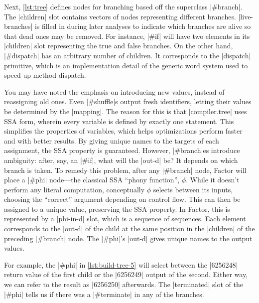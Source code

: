 Next, \vref{lst:tree} defines nodes for branching based off the superclass
\factor|#branch|.  The \factor|children| slot contains vectors of nodes
representing different branches.  \factor|live-branches| is filled in during
later analyses to indicate which branches are alive so that dead ones may be
removed.  For instance, \factor|#if| will have two elements in its
\factor|children| slot representing the true and false branches.  On the other
hand, \factor|#dispatch| has an arbitrary number of children.  It corresponds
to the \factor|dispatch| primitive, which is an implementation detail of the
generic word system used to speed up method dispatch.

You may have noted the emphasis on introducing new values, instead of
reassigning old ones.  Even \factor|#shuffle|s output fresh identifiers,
letting their values be determined by the \factor|mapping|.  The reason for
this is that \factor|compiler.tree| uses \gls{SSA} form, wherein every variable
is defined by exactly one statement.  This simplifies the properties of
variables, which helps optimizations perform faster and with better
results.  By giving unique names to the targets of each assignment,
the \gls{SSA} property is guaranteed.  However, \factor|#branch|es introduce
ambiguity: after, say, an \factor|#if|, what will the \factor|out-d| be?  It
depends on which branch is taken.  To remedy this problem, after any
\factor|#branch| node, Factor will place a \factor|#phi| node---the classical
\gls{SSA} ``phony function'', $\phi$.  While it doesn't perform any literal
computation, conceptually $\phi$ selects between its inputs, choosing the
``correct'' argument depending on control flow.  This can then be assigned to a
unique value, preserving the \gls{SSA} property.  In Factor, this is
represented by a \factor|phi-in-d| slot, which is a sequence of sequences.
Each element corresponds to the \factor|out-d| of the child at the same
position in the \factor|children| of the preceding \factor|#branch| node.  The
\factor|#phi|'s \factor|out-d| gives unique names to the output values.


For example, the \factor|#phi| in \vref{lst:build-tree-5} will select between
the \factor|6256248| return value of the first child or the \factor|6256249|
output of the second.  Either way, we can refer to the result as
\factor|6256250| afterwards.  The \factor|terminated| slot of the \factor|#phi|
tells us if there was a \factor|#terminate| in any of the branches.

